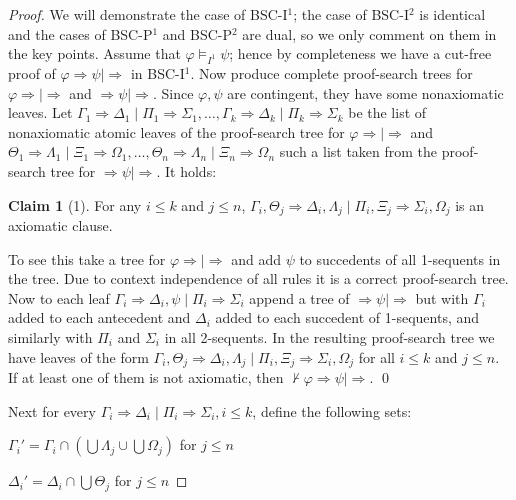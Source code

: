 \documentclass[10pt,a4paper]{article}
\theoremstyle{definition}
\newtheorem{claim}{Claim}[section]
\newcommand{\3}{\vspace{.3in}}
\newcommand{\2}{\vspace{.2in}}
\newcommand{\1}{\vspace{.1in}}
\newcommand{\5}{\vspace{.05in}}
\begin{document}
 \begin{proof}
 	We will demonstrate the case of BSC-I$^1$; the case of BSC-I$^2$ is identical and the cases of BSC-P$^1$ and BSC-P$^2$ are dual, so we only comment on them in the key points. Assume that $\varphi\models_{I^1}\psi$; hence by completeness we have a cut-free proof of $\varphi\Rightarrow\psi\mid\Rightarrow$ in BSC-I$^1$. Now produce complete proof-search trees for
$\varphi\Rightarrow\mid\Rightarrow$ and $\Rightarrow\psi\mid\Rightarrow$. Since $\varphi, \psi$ are contingent, they have some nonaxiomatic leaves. Let $\Gamma_1\Rightarrow\Delta_1\mid\Pi_1\Rightarrow\Sigma_1, \ldots, \Gamma_k\Rightarrow\Delta_k\mid\Pi_k\Rightarrow\Sigma_k$ be the list
of nonaxiomatic atomic leaves of the proof-search tree for $\varphi\Rightarrow\mid\Rightarrow$ and $\Theta_1\Rightarrow\Lambda_1\mid\Xi_1\Rightarrow\Omega_1, \ldots, \Theta_n\Rightarrow\Lambda_n\mid\Xi_n\Rightarrow\Omega_n$ such a list
taken from the proof-search tree for $\Rightarrow\psi\mid\Rightarrow$. It holds: 

\begin{claim}[1]
	For any $i\leq k$ and $j\leq n$, $\Gamma_i, \Theta_j\Rightarrow\Delta_i, \Lambda_j\mid\Pi_i, \Xi_j\Rightarrow\Sigma_i, \Omega_j$ is an axiomatic clause.
\end{claim}

To see this take a tree for $\varphi\Rightarrow\mid\Rightarrow$ and add $\psi$ to succedents of all 1-sequents in the tree. Due to context independence of all rules
it is a correct proof-search tree. Now to each leaf $\Gamma_i\Rightarrow\Delta_i, \psi\mid\Pi_i\Rightarrow\Sigma_i$ append a tree of $\Rightarrow\psi\mid\Rightarrow$ but with $\Gamma_i$ added to each antecedent
and $\Delta_i$ added to each succedent of 1-sequents, and similarly with $\Pi_i$ and $\Sigma_i$ in all 2-sequents. In the resulting proof-search tree we have leaves of the form $\Gamma_i, \Theta_j\Rightarrow\Delta_i, \Lambda_j\mid\Pi_i, \Xi_j\Rightarrow\Sigma_i, \Omega_j$
for all $i\leq k$ and $j\leq n$. If at least one of them is not axiomatic, then $\nvdash \varphi\Rightarrow\psi\mid\Rightarrow$. \qed

\1

Next for every $\Gamma_i\Rightarrow\Delta_i\mid\Pi_i\Rightarrow\Sigma_i, i\leq k$, define the following sets:

\1

$\Gamma_i' = \Gamma_i\cap (\bigcup\Lambda_j\cup\bigcup\Omega_j)$ for $j\leq n$

$\Delta_i' = \Delta_i\cap\bigcup\Theta_j$ for $j\leq n$ 



\end{proof}
\end{document}

